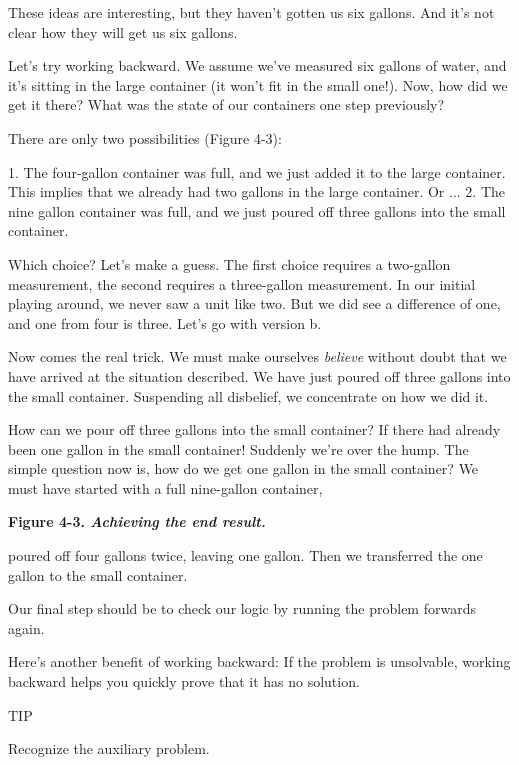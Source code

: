 These ideas are interesting, but they haven't gotten us six gallons.
And it's not clear how they will get us six gallons.

Let's try working backward. We assume we've measured six gallons
of water, and it's sitting in the large container (it won't fit in the
small one!). Now, how did we get it there? What was the state of our
containers one step previously?

There are only two possibilities (Figure 4-3):

1. The four-gallon container was full, and we just added it to the large
   container. This implies that we already had two gallons in the large
   container.
   Or ...
2. The nine gallon container was full, and we just poured off three gallons
   into the small container.

Which choice? Let's make a guess. The first choice requires a two-gallon
measurement, the second requires a three-gallon measurement. In our initial
playing around, we never saw a unit like two. But we did see a difference
of one, and one from four is three. Let's go with version b.

Now comes the real trick. We must make ourselves \emph{believe} without
doubt that we have arrived at the situation described. We have just
poured off three gallons into the small container. Suspending all disbelief,
we concentrate on how we did it.

How can we pour off three gallons into the small container? If there
had already been one gallon in the small container! Suddenly we're over
the hump. The simple question now is, how do we get one gallon in the
small container? We must have started with a full nine-gallon container,

\bf{Figure 4-3.} \emph{Achieving the end result.}


poured off four gallons twice, leaving one gallon. Then we transferred the
one gallon to the small container.

Our final step should be to check our logic by running the problem
forwards again.

Here's another benefit of working backward: If the problem is unsolvable,
working backward helps you quickly prove that it has no solution.

TIP

Recognize the auxiliary problem.


